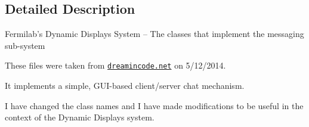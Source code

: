 \subsection{Detailed Description}
Fermilab's Dynamic Displays System -- The classes that implement the messaging sub-\/system

These files were taken from \href{http://www.dreamincode.net/forums/topic/259777-a-simple-chat-program-with-clientserver-gui-optional/}{\tt dreamincode.\-net} on 5/12/2014.

It implements a simple, G\-U\-I-\/based client/server chat mechanism.

I have changed the class names and I have made modifications to be useful in the context of the Dynamic Displays system.